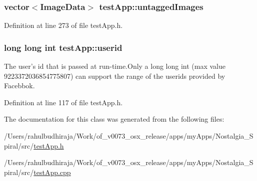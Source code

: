 \hypertarget{classtest_app_a9cb9aa0700c4c8b316329a86c4e650ec}{
\subsubsection[{untagged\-Images}]{\setlength{\rightskip}{0pt plus 5cm}vector$<${\bf Image\-Data}$>$ test\-App\-::untagged\-Images}}\label{classtest_app_a9cb9aa0700c4c8b316329a86c4e650ec}


Definition at line 273 of file test\-App.\-h.

\hypertarget{classtest_app_a6ae76dc97fbeee00755f4a6cd6b87e19}{
\subsubsection[{userid}]{\setlength{\rightskip}{0pt plus 5cm}long long int test\-App\-::userid}}\label{classtest_app_a6ae76dc97fbeee00755f4a6cd6b87e19}


The user's id that is passed at run-\/time.\-Only a long long int (max value 9223372036854775807) can support the range of the userids provided by Facebbok. 



Definition at line 117 of file test\-App.\-h.



The documentation for this class was generated from the following files\-:\begin{DoxyCompactItemize}
\item 
/\-Users/rahulbudhiraja/\-Work/of\-\_\-v0073\-\_\-osx\-\_\-release/apps/my\-Apps/\-Nostalgia\-\_\-\-Spiral/src/\hyperlink{test_app_8h}{test\-App.\-h}\item 
/\-Users/rahulbudhiraja/\-Work/of\-\_\-v0073\-\_\-osx\-\_\-release/apps/my\-Apps/\-Nostalgia\-\_\-\-Spiral/src/\hyperlink{test_app_8cpp}{test\-App.\-cpp}\end{DoxyCompactItemize}
